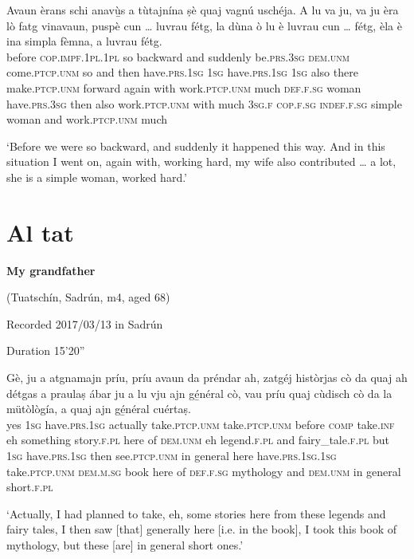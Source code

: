 \begin{linenumbers}
\gll    Avaun èrans schi anavù̱s a tùtajnína ṣè quaj vagnú uschéja. A lu va ju, va ju èra lò fatg vinavaun, puspè cun … luvrau fétg, la dùna ò lu è luvrau cun … fétg, èla è ina simpla fèmna, a luvrau fétg.\\
before \textsc{cop.impf.1pl.1pl} so backward and suddenly be.\textsc{prs.3sg} \textsc{dem.unm} come.\textsc{ptcp.unm} so and then have.\textsc{prs.1sg} \textsc{1sg} have.\textsc{prs.1sg} \textsc{1sg} also there  make.\textsc{ptcp.unm} forward again with {} work.\textsc{ptcp.unm} much \textsc{def.f.sg} woman have.\textsc{prs.3sg} then also work.\textsc{ptcp.unm} with {} much \textsc{3sg.f} \textsc{cop.f.sg} \textsc{indef.f.sg} simple woman and work.\textsc{ptcp.unm} much\\
\end{linenumbers}
\medskip
\glt `Before we were so backward, and suddenly it happened this way. And in this situation I went on, again with, working hard, my wife also contributed … a lot, she is a simple woman, worked hard.'
\medskip

\section{Al tat}


\textbf{My grandfather}

\noindent
(Tuatschín, Sadrún, m4, aged 68)

\noindent
Recorded 2017/03/13 in Sadrún

\noindent
Duration 15'20''
\bigskip

\begin{linenumbers}
\gll Gè, ju a atgnamajn príu, príu avaun da préndar ah, zatgéj històrjas cò da quaj ah détgas a praulaṣ ábar ju a lu vju ajn gé̱néral cò, vau príu quaj cùdisch cò da la mütòlògía\footnotemark, a quaj ajn gé̱néral cuértaṣ.\\
yes \textsc{1sg} have.\textsc{prs.1sg} actually take.\textsc{ptcp.unm} take.\textsc{ptcp.unm} before \textsc{comp} take.\textsc{inf} eh something story.\textsc{f.pl} here of \textsc{dem.unm} eh legend.\textsc{f.pl} and fairy\_tale.\textsc{f.pl} but \textsc{1sg} have.\textsc{prs.1sg} then see.\textsc{ptcp.unm} in general here have.\textsc{prs.1sg.1sg} take.\textsc{ptcp.unm}  \textsc{dem.m.sg} book here of \textsc{def.f.sg} mythology and  \textsc{dem.unm} in general short.\textsc{f.pl} \\
\end{linenumbers}
\medskip
\glt `Actually, I had planned to take, eh, some stories here from these legends and fairy tales, I then saw [that] generally here [i.e. in the book], I took this book of mythology, but these [are] in general short ones.'
\medskip

